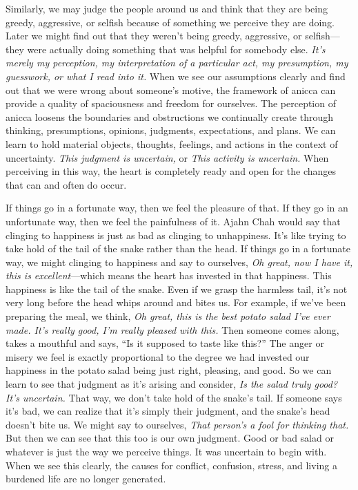 Similarly, we may judge the people around us and think that they are 
being greedy, aggressive, or selfish because of something we perceive 
they are doing. Later we might find out that they weren't being greedy, 
aggressive, or selfish---they were actually doing something that was 
helpful for somebody else. \emph{It's merely my perception, my 
interpretation of a particular act, my presumption, my guesswork, or 
what I read into it.} When we see our assumptions clearly and find out 
that we were wrong about someone's motive, the framework of anicca can 
provide a quality of spaciousness and freedom for ourselves. The 
perception of anicca loosens the boundaries and obstructions we 
continually create through thinking, presumptions, opinions, judgments, 
expectations, and plans. We can learn to hold material objects, 
thoughts, feelings, and actions in the context of uncertainty. 
\emph{This judgment is uncertain,} or \emph{This activity is 
uncertain.} When perceiving in this way, the heart is completely ready 
and open for the changes that can and often do occur.

If things go in a fortunate way, then we feel the pleasure of that. If 
they go in an unfortunate way, then we feel the painfulness of it. 
Ajahn Chah would say that clinging to happiness is just as bad as 
clinging to unhappiness. It's like trying to take hold of the tail of 
the snake rather than the head. If things go in a fortunate way, we 
might clinging to happiness and say to ourselves, \emph{Oh great, now I 
have it, this is excellent}---which means the heart has invested in 
that happiness. This happiness is like the tail of the snake. Even if 
we grasp the harmless tail, it's not very long before the head whips 
around and bites us. For example, if we've been preparing the meal, we 
think, \emph{Oh great, this is the best potato salad I've ever made. 
It's really good, I'm really pleased with this.} Then someone comes 
along, takes a mouthful and says, ``Is it supposed to taste like 
this?'' The anger or misery we feel is exactly proportional to the 
degree we had invested our happiness in the potato salad being just 
right, pleasing, and good. So we can learn to see that judgment as it's 
arising and consider, \emph{Is the salad truly good? It's uncertain.} 
That way, we don't take hold of the snake's tail. If someone says it's 
bad, we can realize that it's simply their judgment, and the snake's 
head doesn't bite us. We might say to ourselves, \emph{That person's a 
fool for thinking that.} But then we can see that this too is our own 
judgment. Good or bad salad or whatever is just the way we perceive 
things. It was uncertain to begin with. When we see this clearly, the 
causes for conflict, confusion, stress, and living a burdened life are 
no longer generated.

